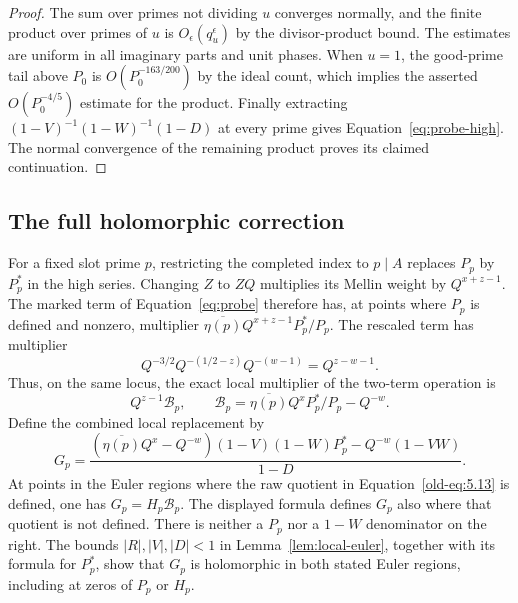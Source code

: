 \documentclass[12pt]{article}
\begin{document}
\begin{proof}
The sum over primes not dividing $u$ converges normally, and the
finite product over primes of $u$ is $O_\epsilon(q_u^\epsilon)$
by the divisor-product bound.  The estimates are uniform in all
imaginary parts and unit phases.  When $u=1$, the good-prime tail
above $P_0$ is $O(P_0^{-163/200})$ by the ideal count, which implies
the asserted $O(P_0^{-4/5})$ estimate for the product.
Finally extracting $(1-V)^{-1}(1-W)^{-1}(1-D)$ at every prime
gives Equation~\eqref{eq:probe-high}.  The normal convergence of
the remaining product proves its claimed continuation.
\end{proof}
\subsection{The full holomorphic correction}

For a fixed slot prime $p$, restricting the completed index to
$p\mid A$ replaces $P_p$ by $P_p^*$ in the high series.  Changing
$Z$ to $ZQ$ multiplies its Mellin weight by $Q^{x+z-1}$.  The
marked term of Equation~\eqref{eq:probe}
therefore has, at points where $P_p$ is defined and nonzero, multiplier
$\overline{\eta(p)}Q^{x+z-1}P_p^*/P_p$.  The rescaled term has
multiplier
\[
 Q^{-3/2}Q^{-(1/2-z)}Q^{-(w-1)}=Q^{z-w-1}.
\]
Thus, on the same locus, the exact local multiplier of the two-term operation is
\begin{equation}\label{old-eq:5.13}
 Q^{z-1}\mathcal B_p,\qquad
 \mathcal B_p=\overline{\eta(p)}Q^xP_p^*/P_p-Q^{-w}.
\end{equation}
Define the combined local replacement by
\begin{equation}\label{old-eq:5.13c}
 G_p=
 \frac{(\overline{\eta(p)}Q^x-Q^{-w})(1-V)(1-W)P_p^*
       -Q^{-w}(1-VW)}{1-D}.
\end{equation}
At points in the Euler regions where the raw quotient in
Equation~\eqref{old-eq:5.13} is defined, one has $G_p=H_p\mathcal B_p$.
The displayed formula defines
$G_p$ also where that quotient is not defined.  There is neither a $P_p$
nor a $1-W$ denominator on the right.  The bounds $|R|,|V|,|D|<1$ in
Lemma~\ref{lem:local-euler}, together with its formula for $P_p^*$, show
that $G_p$ is holomorphic in both stated Euler regions, including at zeros
of $P_p$ or $H_p$.
\end{document}
